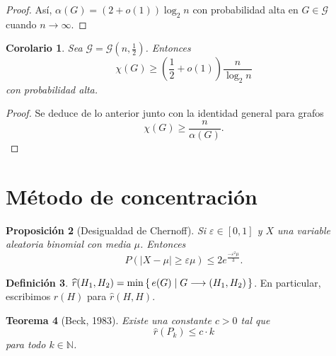\documentclass[12pt]{report}
\theoremstyle{plain}
\newtheorem{theorem}{Teorema}[section]
\newtheorem{proposition}[theorem]{Proposición}
\newtheorem{corollary}[theorem]{Corolario}
\theoremstyle{definition}
\newtheorem{definition}[theorem]{Definición}
\newcommand{\naturals}{\mathbb{N}}
\newcommand{\abs}[1]{\left \vert #1 \right \vert}
\renewcommand{\hat}[1]{\widehat{#1}}
\begin{document}
\begin{proof}
Así, $\alpha (G) = (2 + o(1))  \log_2 n$ con probabilidad alta en $G \in \mathcal G$ cuando $n \to \infty$.


\end{proof}

\begin{corollary}\label{corolario:cota inferior para el numero cromatico del grafo aleatorio con p = 1/2 es la mitad de n /log2n}
Sea $\mathcal G = \mathcal G(n, \frac 1 2)$. Entonces
\[
\chi (G) \geq \left (\frac 1 {2} + o(1) \right ) \frac{n}{\log_2 n}
\]
con probabilidad alta.
\end{corollary}
\begin{proof}
Se deduce de lo anterior junto con la identidad general para grafos
\[
    \chi (G) \geq \frac{n}{\alpha(G)}.
\]
\end{proof}


\section{Método de concentración}



\begin{proposition}[Desigualdad de Chernoff]\label{proposition:desigualdad de chernoff}
Si $\varepsilon \in [0, 1]$ y $X$ una variable aleatoria binomial con media $\mu$. Entonces
\[
    P (\abs{X - \mu} \geq \varepsilon \mu) \leq 2 e^{\frac{-\varepsilon^2 \mu}{3}}.
\]
\end{proposition}

\begin{definition}
$\hat r (H_1,H_2) = \min \set{e(G) | G \longrightarrow (H_1,H_2)}$. En particular, escribimos $\hat r (H)$ para $\hat r (H,H)$.
\end{definition}

\begin{theorem}[Beck, 1983]\label{th:teorema de Beck}
Existe una constante $c > 0$ tal que
\[
    \hat r (P_k) \leq c \cdot k
\]
para todo $k \in \naturals$.
\end{theorem}
\end{document}

